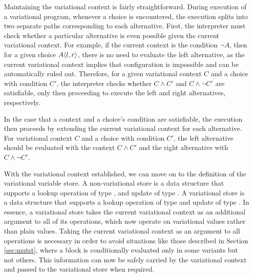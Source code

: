 \documentclass[12pt,oneside]{book}
\begin{document}
Maintaining the variational context is fairly straightforward. During execution of a variational program, whenever a choice is encountered, the execution splits into
two separate paths corresponding to each alternative. First, the interpreter must check whether a particular alternative is even possible given the current variational
context. For example, if the current context is the condition $\neg A$, then for a given choice $A \langle l, r \rangle$, there is no need to evaluate the left alternative, as the current
variational context implies that
configuration is impossible and can be automatically ruled out. Therefore, for a given variational context $C$ and a choice with condition $C'$, the interpreter checks
whether $C \wedge C'$ and $C \wedge \neg C'$ are satisfiable, only then proceeding to execute the left and right alternatives, respectively.

In the case that a context and a choice's condition are satisfiable, the execution then proceeds by extending the current variational context for each alternative.
For variational context $C$ and a choice with condition $C'$, the left alternative should be evaluated with the context $C \wedge C'$ and the right alternative with
$C \wedge \neg C'$.

With the variational context established, we can move on to the definition of the variational variable store. A non-variational store is a data structure
that supports a lookup operation of type , and update of type .
A variational store is a data structure that supports a lookup operation of type  and update of type
. In essence, a variational store takes the current variational context as an
additional argument to all of its operations, which now operate on variational values rather than plain values. Taking the current variational context as an argument to all
operations is necessary in order to avoid situations like those described in Section \ref{sec:mutst}, where a block is conditionally
evaluated only in some variants but not others. This information can now be safely carried by the variational context and passed
to the variational store when required.
\end{document}
